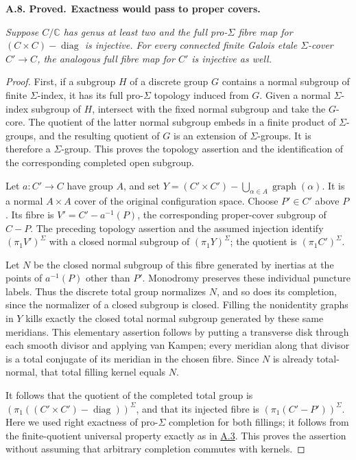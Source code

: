 \documentclass[11pt,a4paper]{article}
\newenvironment{claim}[3]{\par\medskip\noindent\hypertarget{#1}{\textbf{#1. #2.}}\ \textbf{#3.}\par\nopagebreak\smallskip\begingroup\itshape}{\endgroup\par\smallskip}
\newcommand{\statementref}[1]{\hyperlink{#1}{#1}}
\begin{document}
\begin{claim}{A.8}{Proved}{Exactness would pass to proper covers}
Suppose $C/\mathbb C$ has genus at least two and the full pro-$\Sigma$
fibre map for $(C\times C)-\operatorname{diag}$ is injective.
For every connected finite Galois etale $\Sigma$-cover $C'\to C$,
the analogous full fibre map for $C'$ is injective as well.
\end{claim}
\begin{proof}
First, if a subgroup $H$ of a discrete group $G$ contains a normal
subgroup of finite $\Sigma$-index, it has its full pro-$\Sigma$
topology induced from $G$. Given a normal $\Sigma$-index subgroup
of $H$, intersect with the fixed normal subgroup and take the
$G$-core. The quotient of the latter normal subgroup embeds in a
finite product of $\Sigma$-groups, and the resulting quotient of
$G$ is an extension of $\Sigma$-groups. It is therefore a
$\Sigma$-group. This proves the topology assertion and the
identification of the corresponding completed open subgroup.

Let $a:C'\to C$ have group $A$, and set
$Y=(C'\times C')-\bigcup_{\alpha\in A}\operatorname{graph}(\alpha)$.
It is a normal $A\times A$ cover of the original configuration
space. Choose $P'\in C'$ above $P$. Its fibre is
$V'=C'-a^{-1}(P)$, the corresponding proper-cover subgroup of
$C-P$. The preceding topology assertion and the assumed injection
identify $(\pi_1V')^\Sigma$ with a closed normal subgroup of
$(\pi_1Y)^\Sigma$; the quotient is $(\pi_1C')^\Sigma$.

Let $N$ be the closed normal subgroup of this fibre generated by
inertias at the points of $a^{-1}(P)$ other than $P'$. Monodromy
preserves these individual puncture labels. Thus the discrete total
group normalizes $N$, and so does its completion, since the
normalizer of a closed subgroup is closed. Filling the nonidentity
graphs in $Y$ kills exactly the closed total normal subgroup generated
by these same meridians. This elementary assertion follows by putting
a transverse disk through each smooth divisor and applying van
Kampen; every meridian along that divisor is a total conjugate of
its meridian in the chosen fibre. Since $N$ is already total-normal,
that total filling kernel equals $N$.

It follows that the quotient of the completed total group is
$(\pi_1((C'\times C')-\operatorname{diag}))^\Sigma$, and that its
injected fibre is $(\pi_1(C'-P'))^\Sigma$. Here we used right
exactness of pro-$\Sigma$ completion for both fillings; it follows
from the finite-quotient universal property exactly as in
\statementref{A.3}. This proves the assertion without assuming
that arbitrary completion commutes with kernels.
\end{proof}
\end{document}
